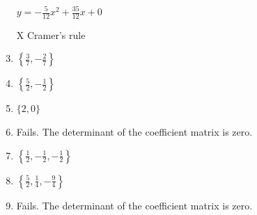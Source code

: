 \documentclass[10pt]{amsart}
\begin{document}
\begin{multicols}{2}
\begin{enumerate}
$y=-\frac{5}{12}x^2+\frac{35}{12}x+0
$
%
%
\item[X] Cramer's rule
%
\item $\left\{\frac{3}{7},-\frac{2}{7}\right\}$
\item $\left\{\frac{5}{2},-\frac{1}{2}\right\}$
\item $\{2,0\}$
\item Fails. The determinant of the coefficient matrix is zero.
\item $\left\{\frac{1}{2},-\frac{1}{2},-\frac{1}{2}\right\}$
\item $\left\{\frac{5}{2},\frac{1}{4},-\frac{9}{4}\right\}$
\item Fails. The determinant of the coefficient matrix is zero.
%
%


















	
\end{enumerate}


\end{multicols}
\end{document}
